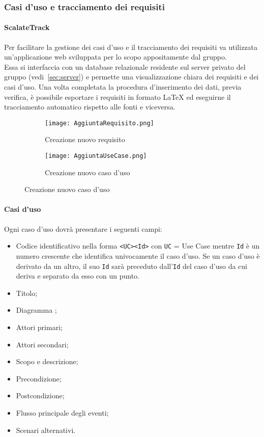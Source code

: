 \documentclass{scalatekids-article}
\begin{document}
\subsubsection{Casi d'uso e tracciamento dei requisiti}

\label{sec:front-end}

\paragraph{ScalateTrack}

Per facilitare la gestione dei casi d'uso e il tracciamento dei requisiti
va utilizzata un'applicazione web sviluppata per lo scopo appositamente dal
gruppo.\\Essa si interfaccia con un database relazionale residente sul server
privato del gruppo (vedi~\ref{sec:server}) e permette una visualizzazione chiara dei
requisiti e dei casi d'uso. Una volta completata la procedura d'inserimento dei
dati, previa verifica, è possibile esportare i requisiti in formato
\LaTeX\xspace ed eseguirne il tracciamento automatico rispetto alle
fonti e viceversa.

\begin{figure}[H]
    \begin{subfigure}[H]{0.47\textwidth}
        \centering
        \texttt{[image: AggiuntaRequisito.png]}
        \caption{Creazione nuovo requisito}
    \end{subfigure}
    \qquad
    \begin{subfigure}[H]{0.47\textwidth}
        \centering
        \texttt{[image: AggiuntaUseCase.png]}
        \caption{Creazione nuovo caso d'uso}
    \end{subfigure}
\end{figure}

\paragraph{Casi d'uso}

Ogni caso d'uso dovrà presentare i seguenti campi:
\begin{itemize}
    \item Codice identificativo nella forma \verb=<UC><Id>= con \verb=UC= = Use
        Case mentre \verb=Id= è un numero crescente che identifica univocamente il
        caso d'uso. Se un caso d'uso è derivato da un altro, il suo \verb=Id= sarà
        preceduto dall'\verb=Id= del caso d'uso da cui deriva e separato da esso con un
        punto.
    \item Titolo;
    \item Diagramma ;
    \item Attori primari;
    \item Attori secondari;
    \item Scopo e descrizione;
    \item Precondizione;
    \item Postcondizione;
    \item Flusso principale degli eventi;
    \item Scenari alternativi.
\end{itemize}
\end{document}
